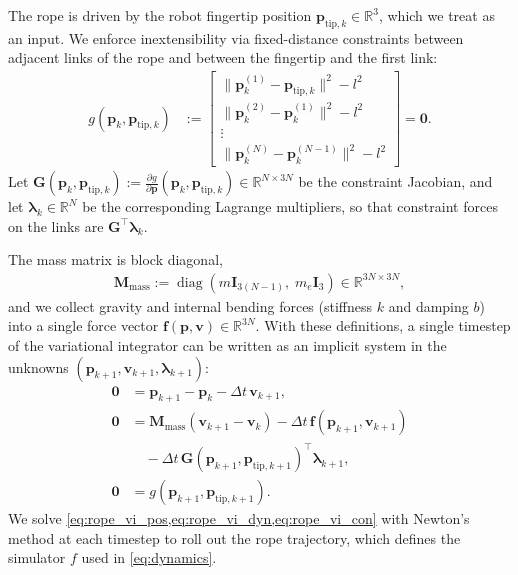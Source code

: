 \documentclass[conference]{IEEEtran}
\begin{document}
The rope is driven by the robot fingertip position $\mathbf{p}_{\mathrm{tip},k}\in\mathbb{R}^3$, which we treat as an input. We enforce inextensibility via fixed-distance constraints between adjacent links of the rope and between the fingertip and the first link:
\begin{align*}
    g(\mathbf{p}_k, \mathbf{p}_{\mathrm{tip},k})
    &:=
    \begin{bmatrix}
        \|\mathbf{p}_k^{(1)} - \mathbf{p}_{\mathrm{tip},k}\|^2 - l^2 \\
        \|\mathbf{p}_k^{(2)} - \mathbf{p}_k^{(1)}\|^2 - l^2 \\
        \vdots \\
        \|\mathbf{p}_k^{(N)} - \mathbf{p}_k^{(N-1)}\|^2 - l^2
    \end{bmatrix}
    = \mathbf{0}.
\end{align*}
Let $\mathbf{G}(\mathbf{p}_k, \mathbf{p}_{\mathrm{tip},k}) := \frac{\partial g}{\partial \mathbf{p}}(\mathbf{p}_k, \mathbf{p}_{\mathrm{tip},k}) \in \mathbb{R}^{N\times 3N}$ be the constraint Jacobian, and let $\boldsymbol{\lambda}_k\in\mathbb{R}^{N}$ be the corresponding Lagrange multipliers, so that constraint forces on the links are $\mathbf{G}^\top \boldsymbol{\lambda}_k$.

The mass matrix is block diagonal,
\begin{align*}
    \mathbf{M}_{\mathrm{mass}} := \operatorname{diag}\!\left(m\mathbf{I}_{3(N-1)},\; m_e \mathbf{I}_3\right)\in\mathbb{R}^{3N\times 3N},
\end{align*}
and we collect gravity and internal bending forces (stiffness $k$ and damping $b$) into a single force vector $\mathbf{f}(\mathbf{p},\mathbf{v})\in\mathbb{R}^{3N}$. With these definitions, a single timestep of the variational integrator can be written as an implicit system in the unknowns $(\mathbf{p}_{k+1},\mathbf{v}_{k+1},\boldsymbol{\lambda}_{k+1})$:
\begin{align}
    \mathbf{0} &=
    \mathbf{p}_{k+1} - \mathbf{p}_k - \Delta t\, \mathbf{v}_{k+1},
    \label{eq:rope_vi_pos}\\
    \mathbf{0} &=
    \mathbf{M}_{\mathrm{mass}}(\mathbf{v}_{k+1}-\mathbf{v}_k)
    - \Delta t\,\mathbf{f}(\mathbf{p}_{k+1}, \mathbf{v}_{k+1})
    \nonumber\\
    &\quad
    - \Delta t\,\mathbf{G}(\mathbf{p}_{k+1}, \mathbf{p}_{\mathrm{tip},k+1})^\top \boldsymbol{\lambda}_{k+1},
    \label{eq:rope_vi_dyn}\\
    \mathbf{0} &= g(\mathbf{p}_{k+1}, \mathbf{p}_{\mathrm{tip},k+1}).
    \label{eq:rope_vi_con}
\end{align}
We solve \cref{eq:rope_vi_pos,eq:rope_vi_dyn,eq:rope_vi_con} with Newton's method at each timestep to roll out the rope trajectory, which defines the simulator $f$ used in \cref{eq:dynamics}.
\end{document}
